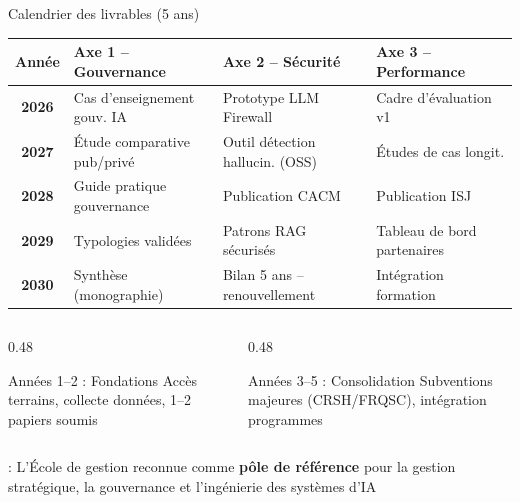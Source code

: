\documentclass[aspectratio=169,11pt]{beamer}
\begin{document}
\begin{frame}{Calendrier des livrables (5 ans)}
  \scriptsize
  \begin{center}
    \renewcommand{\arraystretch}{1.2}
    \begin{tabular}{|c|l|l|l|}
      \hline
      \rowcolor{usherbgreen!20}
      \textbf{Année} & \textbf{Axe 1 -- Gouvernance} & \textbf{Axe 2 -- Sécurité} & \textbf{Axe 3 -- Performance} \\
      \hline
      \textbf{2026} & Cas d'enseignement gouv. IA & Prototype LLM Firewall & Cadre d'évaluation v1 \\
      \hline
      \textbf{2027} & Étude comparative pub/privé & Outil détection hallucin. (OSS) & Études de cas longit. \\
      \hline
      \textbf{2028} & Guide pratique gouvernance & Publication CACM & Publication ISJ \\
      \hline
      \textbf{2029} & Typologies validées & Patrons RAG sécurisés & Tableau de bord partenaires \\
      \hline
      \textbf{2030} & Synthèse (monographie) & Bilan 5 ans -- renouvellement & Intégration formation \\
      \hline
    \end{tabular}
  \end{center}
  
  \vspace{0.3em}
  
  \begin{columns}[T]
    \begin{column}{0.48\textwidth}
      \begin{block}{Années 1--2 : Fondations}\scriptsize
        Accès terrains, collecte données, 1--2 papiers soumis
      \end{block}
    \end{column}
    \begin{column}{0.48\textwidth}
      \begin{block}{Années 3--5 : Consolidation}\scriptsize
        Subventions majeures (CRSH/FRQSC), intégration programmes
      \end{block}
    \end{column}
  \end{columns}
  
  \vspace{0.2em}
  
  \begin{center}
     : L'École de gestion reconnue comme \textbf{pôle de référence} pour la gestion stratégique, la gouvernance et l'ingénierie des systèmes d'IA
  \end{center}
\end{frame}
\end{document}
